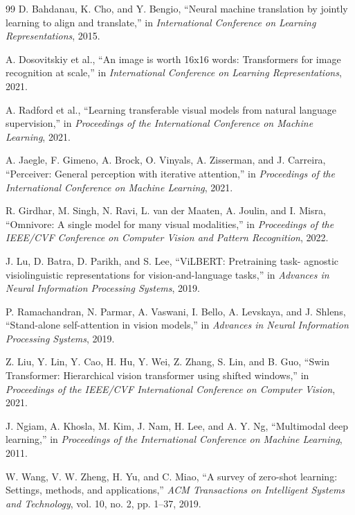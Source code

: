 \documentclass[10pt,conference]{IEEEtran}
\begin{document}
\begin{thebibliography}{99}
D. Bahdanau, K. Cho, and Y. Bengio, ``Neural machine translation by
jointly learning to align and translate,'' in \emph{International
Conference on Learning Representations}, 2015.

A. Dosovitskiy et al., ``An image is worth 16x16 words: Transformers for
image recognition at scale,'' in \emph{International Conference on
Learning Representations}, 2021.

A. Radford et al., ``Learning transferable visual models from natural
language supervision,'' in \emph{Proceedings of the International
Conference on Machine Learning}, 2021.

A. Jaegle, F. Gimeno, A. Brock, O. Vinyals, A. Zisserman, and
J. Carreira, ``Perceiver: General perception with iterative attention,''
in \emph{Proceedings of the International Conference on Machine
Learning}, 2021.

R. Girdhar, M. Singh, N. Ravi, L. van der Maaten, A. Joulin, and
I. Misra, ``Omnivore: A single model for many visual modalities,'' in
\emph{Proceedings of the IEEE/CVF Conference on Computer Vision and
Pattern Recognition}, 2022.

J. Lu, D. Batra, D. Parikh, and S. Lee, ``ViLBERT: Pretraining task-
agnostic visiolinguistic representations for vision-and-language tasks,''
in \emph{Advances in Neural Information Processing Systems}, 2019.

P. Ramachandran, N. Parmar, A. Vaswani, I. Bello, A. Levskaya, and
J. Shlens, ``Stand-alone self-attention in vision models,'' in
\emph{Advances in Neural Information Processing Systems}, 2019.

Z. Liu, Y. Lin, Y. Cao, H. Hu, Y. Wei, Z. Zhang, S. Lin, and B. Guo,
``Swin Transformer: Hierarchical vision transformer using shifted
windows,'' in \emph{Proceedings of the IEEE/CVF International Conference
on Computer Vision}, 2021.

J. Ngiam, A. Khosla, M. Kim, J. Nam, H. Lee, and A. Y. Ng, ``Multimodal
deep learning,'' in \emph{Proceedings of the International Conference on
Machine Learning}, 2011.

W. Wang, V. W. Zheng, H. Yu, and C. Miao, ``A survey of zero-shot
learning: Settings, methods, and applications,'' \emph{ACM Transactions on
Intelligent Systems and Technology}, vol. 10, no. 2, pp. 1--37, 2019.


\end{thebibliography}
\end{document}
